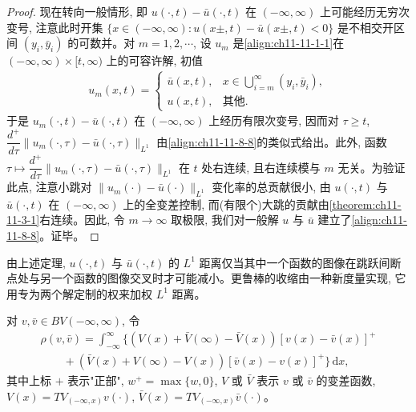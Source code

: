 \documentclass[../../main.tex]{subfiles}
\begin{document}
\begin{proof}
现在转向一般情形, 即 $u(\cdot,t)-\bar u(\cdot,t)$ 在 $(-\infty,\infty)$ 上可能经历无穷次变号, 注意此时开集 $\{x\in(-\infty,\infty):u(x\pm,t)-\bar u(x\pm,t)<0\}$ 是不相交开区间 $(y_i,\bar y_i)$ 的可数并。对 $m=1,2,\cdots$, 设 $u_m$ 是\eqref{align:ch11-11-1-1}在 $(-\infty,\infty)\times[t,\infty)$ 上的可容许解, 初值
\begin{align}
u_m(x,t)=
\begin{cases}
\bar u(x,t), & x\in\bigcup\limits_{i=m}^\infty(y_i,\bar y_i),\\
u(x,t), & \text{其他}.
\end{cases}\label{align:ch11-11-8-10}
\end{align}
于是 $u_m(\cdot,t)-\bar u(\cdot,t)$ 在 $(-\infty,\infty)$ 上经历有限次变号, 因而对 $\tau\geqslant t$, $\dfrac{d^+}{d\tau}\|u_m(\cdot,\tau)-\bar u(\cdot,\tau)\|_{L^1}$ 由\eqref{align:ch11-11-8-8}的类似式给出。此外, 函数 $\tau\mapsto\dfrac{d^+}{d\tau}\|u_m(\cdot,\tau)-\bar u(\cdot,\tau)\|_{L^1}$ 在 $t$ 处右连续, 且右连续模与 $m$ 无关。为验证此点, 注意小跳对 $\|u_m(\cdot)-\bar u(\cdot)\|_{L^1}$ 变化率的总贡献很小, 由 $u(\cdot,t)$ 与 $\bar u(\cdot,t)$ 在 $(-\infty,\infty)$ 上的全变差控制, 而(有限个)大跳的贡献由\cref{theorem:ch11-11-3-1}右连续。因此, 令 $m\to\infty$ 取极限, 我们对一般解 $u$ 与 $\bar u$ 建立了\eqref{align:ch11-11-8-8}。证毕。
\end{proof}

由上述定理, $u(\cdot,t)$ 与 $\bar u(\cdot,t)$ 的 $L^1$ 距离仅当其中一个函数的图像在跳跃间断点处与另一个函数的图像交叉时才可能减小。更鲁棒的收缩由一种新度量实现, 它用专为两个解定制的权来加权 $L^1$ 距离。

对 $v,\bar v\in BV(-\infty,\infty)$, 令
\begin{align}
\rho(v,\bar v)=\int_{-\infty}^\infty\bigl\{(V(x)+\bar V(\infty)-\bar V(x))[v(x)-\bar v(x)]^+\nonumber\\
\qquad+(\bar V(x)+V(\infty)-V(x))[\bar v(x)-v(x)]^+\bigr\}\,\mathrm{d}x,\label{align:ch11-11-8-11}
\end{align}
其中上标 $+$ 表示"正部", $w^+=\max\{w,0\}$, $V$ 或 $\bar V$ 表示 $v$ 或 $\bar v$ 的变差函数, $V(x)=TV_{(-\infty,x)}v(\cdot)$, $\bar V(x)=TV_{(-\infty,x)}\bar v(\cdot)$。
\end{document}
